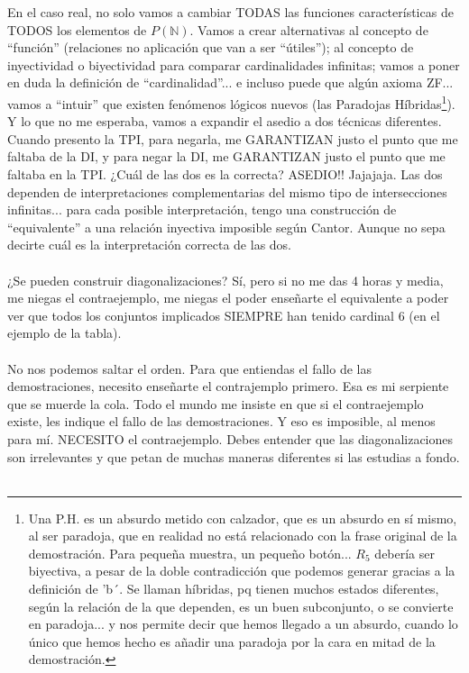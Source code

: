 	\noindent
	En el caso real, no solo vamos a cambiar TODAS las funciones características de TODOS los elementos de $P(\mathbb{N})$. Vamos a crear alternativas al concepto de ``función'' (relaciones no aplicación que van a ser ``útiles''); al concepto de inyectividad o biyectividad para comparar cardinalidades infinitas; vamos a poner en duda la definición de ``cardinalidad''... e incluso puede que algún axioma ZF... vamos a ``intuir'' que existen fenómenos lógicos nuevos (las Paradojas Híbridas\footnote{Una P.H. es un absurdo metido con calzador, que es un absurdo en sí mismo, al ser paradoja, que en realidad no está relacionado con la frase original de la demostración. Para pequeña muestra, un pequeño botón... $R_{5}$ debería ser biyectiva, a pesar de la doble contradicción que podemos generar gracias a la definición de 'b´. Se llaman híbridas, pq tienen muchos estados diferentes, según la relación de la que dependen, es un buen subconjunto, o se convierte en paradoja... y nos permite decir que hemos llegado a un absurdo, cuando lo único que hemos hecho es añadir una paradoja por la cara en mitad de la demostración.}). Y lo que no me esperaba, vamos a expandir el asedio a dos técnicas diferentes. Cuando presento la TPI, para negarla, me GARANTIZAN justo el punto que me faltaba de la DI, y para negar la DI, me GARANTIZAN justo el punto que me faltaba en la TPI. ¿Cuál de las dos es la correcta? ASEDIO!! Jajajaja. Las dos dependen de interpretaciones complementarias del mismo tipo de intersecciones infinitas... para cada posible interpretación, tengo una construcción de ``equivalente'' a una relación inyectiva imposible según Cantor. Aunque no sepa decirte cuál es la interpretación correcta de las dos.\\\\

	\noindent
	¿Se pueden construir diagonalizaciones? Sí, pero si no me das 4 horas y media, me niegas el contraejemplo, me niegas el poder enseñarte el equivalente a poder ver que todos los conjuntos implicados SIEMPRE han tenido cardinal 6 (en el ejemplo de la tabla).\\\\
	
	\noindent
	No nos podemos saltar el orden. Para que entiendas el fallo de las demostraciones, necesito enseñarte el contrajemplo primero. Esa es mi serpiente que se muerde la cola.	Todo el mundo me insiste en que si el contraejemplo existe, les indique el fallo de las demostraciones. Y eso es imposible, al menos para mí. NECESITO el contraejemplo. Debes entender que las diagonalizaciones son irrelevantes y que petan de muchas maneras diferentes si las estudias a fondo.
	\\\\
	
